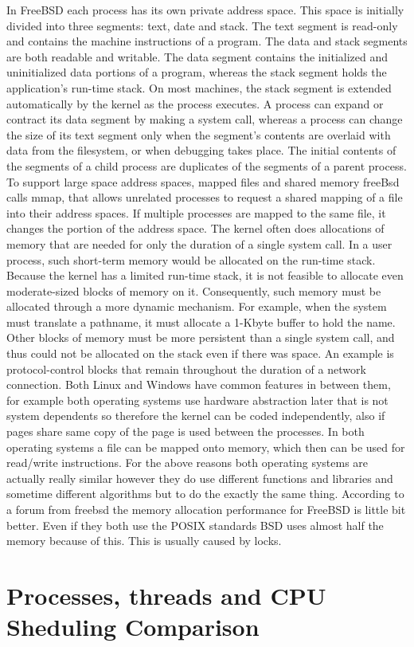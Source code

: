 \documentclass[letterpaper,10pt,draftclsnofoot,onecolumn]{IEEEtran}
\begin{document}
In FreeBSD each process has its own private address space. This space is initially divided into three segments: text, date and stack. The text segment is read-only and contains the machine instructions of a program. The data and stack segments are both readable and writable. The data segment contains the initialized and uninitialized data portions of a program, whereas the stack segment holds the application's run-time stack. On most machines, the stack segment is extended automatically by the kernel as the process executes. A process can expand or contract its data segment by making a system call, whereas a process can change the size of its text segment only when the segment's contents are overlaid with data from the filesystem, or when debugging takes place. The initial contents of the segments of a child process are duplicates of the segments of a parent process.
To support large space address spaces, mapped files and shared memory freeBsd calls mmap, that allows unrelated processes to request a shared mapping of a file into their address spaces. If multiple processes are mapped to the same file, it changes the portion of the address space.
The kernel often does allocations of memory that are needed for only the duration of a single system call. In a user process, such short-term memory would be allocated on the run-time stack. Because the kernel has a limited run-time stack, it is not feasible to allocate even moderate-sized blocks of memory on it. Consequently, such memory must be allocated through a more dynamic mechanism. For example, when the system must translate a pathname, it must allocate a 1-Kbyte buffer to hold the name. Other blocks of memory must be more persistent than a single system call, and thus could not be allocated on the stack even if there was space. An example is protocol-control blocks that remain throughout the duration of a network connection.\cite{[2]}
Both Linux and Windows have common features in between them, for example both operating systems use hardware abstraction later that is not system dependents so therefore the kernel can be coded independently, also if pages share same copy of the page is used between the processes. In both operating systems a file can be mapped onto memory, which then can be used for read/write instructions. For the above reasons both operating systems are actually really similar however they do use different functions and libraries and sometime different algorithms but to do the exactly the same thing. According to a forum from freebsd the memory allocation performance for FreeBSD is little bit better. Even if they both use the POSIX standards BSD uses almost half the memory because of this. This is usually caused by locks.

\appendix
\section{Processes, threads and CPU Sheduling Comparison}\label{AppendixA}





\end{document}

